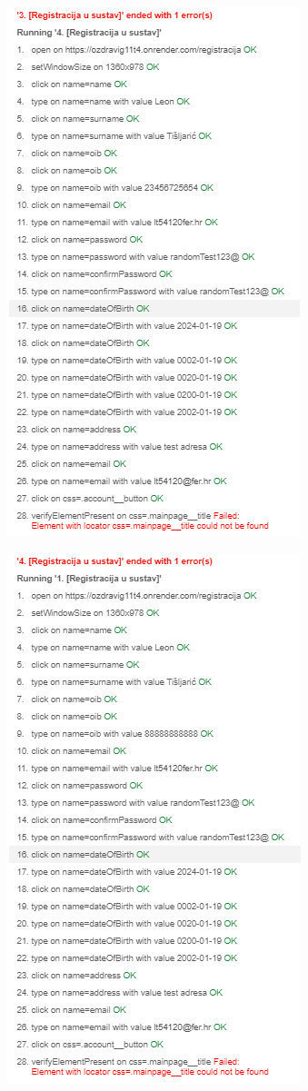 \begin{figure}[H]
	\includegraphics[scale=0.6]{dijagrami/test23.PNG}
	\centering
	\label{fig:myChart}
\end{figure}

\begin{figure}[H]
	\includegraphics[scale=0.6]{dijagrami/test24.PNG}
	\centering
	\label{fig:myChart}
\end{figure}



